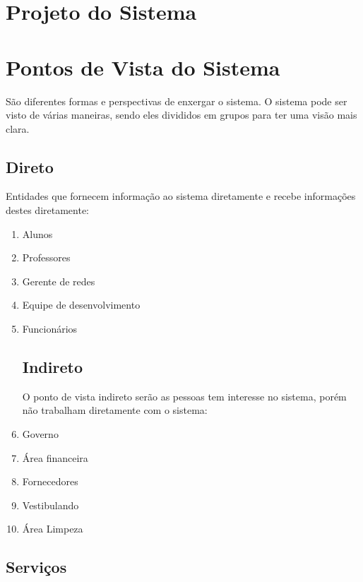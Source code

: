 

\chapter{Projeto do Sistema}

\chapter{Pontos de Vista do Sistema}

São diferentes formas e perspectivas de enxergar o sistema. O sistema pode ser visto de várias maneiras, sendo eles divididos em grupos para ter uma visão mais clara.

\section {Direto}

Entidades que fornecem informação ao sistema diretamente e recebe informações destes diretamente:

\begin{enumerate}
\item Alunos
\item Professores
\item Gerente de redes
\item Equipe de desenvolvimento
\item Funcionários

\section {Indireto}

O ponto de vista indireto serão as pessoas tem interesse no sistema, porém não trabalham diretamente com o sistema:

\item Governo
\item Área financeira
\item Fornecedores
\item Vestibulando 
\item Área Limpeza
\end{enumerate}

\section {Serviços}
